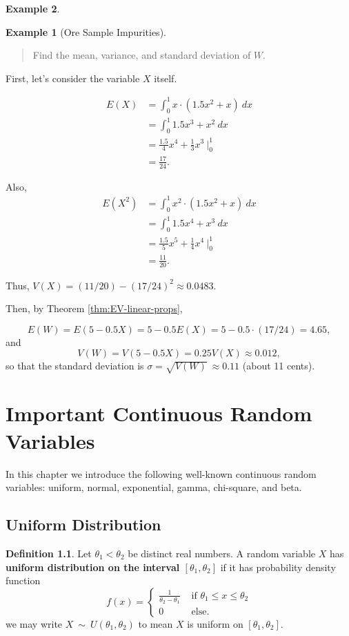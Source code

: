 \documentclass[
]{book}
\theoremstyle{definition}
\newtheorem{definition}{Definition}[chapter]
\theoremstyle{definition}
\newtheorem{example}{Example}[chapter]
\theoremstyle{definition}
\theoremstyle{definition}
\theoremstyle{remark}
\begin{document}
\begin{example}
\begin{example}[Ore Sample Impurities]
\begin{quote}
Find the mean, variance, and standard deviation of \(W\).
\end{quote}

First, let's consider the variable \(X\) itself.

\begin{align*}
E(X) &= \int_0^1 x \cdot (1.5x^2 + x)~dx \\
      &= \int_0^1 1.5x^3 + x^2~dx \\
      &= \frac{1.5}{4}x^4 + \frac{1}{3} x^3 ~\biggr|_0^1 \\
      &= \frac{17}{24}.
\end{align*}

Also,
\begin{align*}
E(X^2) &= \int_0^1 x^2 \cdot (1.5x^2 + x)~dx \\
      &= \int_0^1 1.5x^4 + x^3~dx \\
      &= \frac{1.5}{5}x^5 + \frac{1}{4} x^4 ~\biggr|_0^1 \\
      &= \frac{11}{20}.
\end{align*}

Thus, \(V(X) = (11/20)-(17/24)^2 \approx 0.0483.\)

Then, by Theorem \ref{thm:EV-linear-props},

\[E(W) = E(5 - 0.5X) = 5 - 0.5E(X) = 5 - 0.5\cdot (17/24) = 4.65,\]
and
\[V(W) = V(5 - 0.5X) = 0.25V(X) \approx 0.012,\]
so that the standard deviation is \(\sigma = \sqrt{V(W)} ~\approx 0.11\) (about 11 cents).
\end{example}

\end{example}

\chapter{Important Continuous Random Variables}\label{important-continuous-rv}

In this chapter we introduce the following well-known continuous random variables:
uniform, normal, exponential, gamma, chi-square, and beta.

\section{Uniform Distribution}\label{uniform-continuous}

\begin{definition}
\protect\hypertarget{def:uniform-distribution}{}\label{def:uniform-distribution}Let \(\theta_1 < \theta_2\) be distinct real numbers. A random variable \(X\) has \textbf{uniform distribution on the interval \([\theta_1,\theta_2]\)} if it has probability density function
\[
f(x)=
\begin{cases}
\frac{1}{\theta_2 - \theta_1} &\text{ if }\theta_1 \leq x \leq \theta_2 \\
0 &\text{ else.} 
\end{cases}
\]
we may write \(X ~\sim~ U(\theta_1,\theta_2)\) to mean \(X\) is uniform on \([\theta_1,\theta_2]\).
\end{definition}
\end{document}
